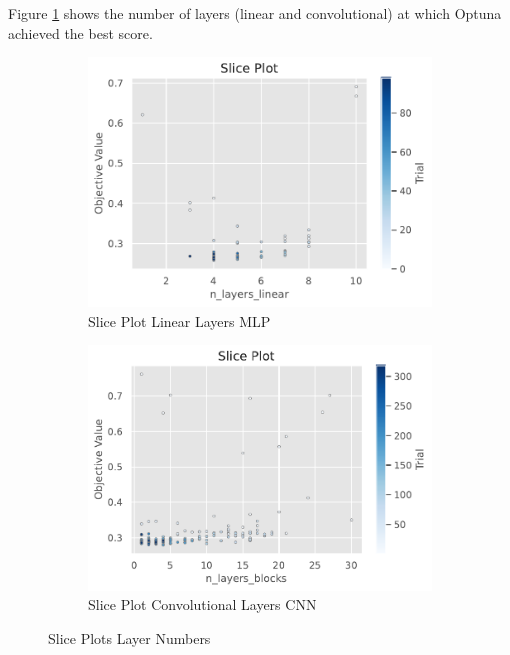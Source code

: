 \documentclass[runningheads]{llncs}
\begin{document}
Figure \ref{fig:hyperparam-slice-fcn-cnn} shows the number of layers (linear and convolutional) at which Optuna achieved the best score.

\begin{figure}[h]
     \centering
     \begin{subfigure}[b]{0.49\textwidth}
         \centering
        \includegraphics[width=\textwidth]{images/number_layers_mlp.pdf}
        \caption{Slice Plot Linear Layers MLP}

     \end{subfigure}
     \hfill
     \begin{subfigure}[b]{0.49\textwidth}
         \centering
    \includegraphics[width=\textwidth]{images/number_layers_cnn.pdf}
    \caption{Slice Plot Convolutional Layers CNN}
    \end{subfigure}
    \caption{Slice Plots Layer Numbers}

    \label{fig:hyperparam-slice-fcn-cnn}
\end{figure}
\end{document}
